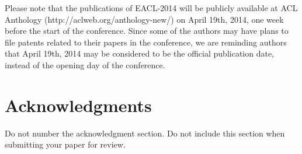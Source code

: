 \documentclass[11pt]{article}
\begin{document}
Please note that the publications of EACL-2014 will be publicly
available at ACL Anthology (http://aclweb.org/anthology-new/) on April
19th, 2014, one week before the start of the conference. Since some of
the authors may have plans to file patents related to their papers in
the conference, we are reminding authors that April 19th, 2014 may be
considered to be the official publication date, instead of the opening
day of the conference.

\section*{Acknowledgments}

Do not number the acknowledgment section. Do not include this section
when submitting your paper for review.










\end{document}
